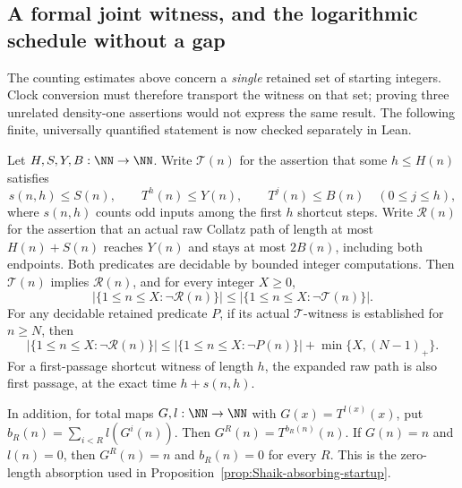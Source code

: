 \subsection{A formal joint witness, and the logarithmic schedule without a gap}

The counting estimates above concern a \emph{single} retained set of
starting integers. Clock conversion must therefore transport the
witness on that set; proving three unrelated density-one assertions
would not express the same result. The following finite, universally
quantified statement is now checked separately in Lean.

\begin{proposition}
\label{prop:Shaik-joint-certificate}
Let \(H,S,Y,B:\NN\to\NN\). Write \(\mathcal T(n)\) for the assertion
that some \(h\le H(n)\) satisfies
\[
 s(n,h)\le S(n),\qquad T^h(n)\le Y(n),\qquad
 T^j(n)\le B(n)\quad(0\le j\le h),
\]
where \(s(n,h)\) counts odd inputs among the first \(h\) shortcut
steps. Write \(\mathcal R(n)\) for the assertion that an actual
raw Collatz path of length at most \(H(n)+S(n)\) reaches \(Y(n)\)
and stays at most \(2B(n)\), including both endpoints.
Both predicates are decidable by bounded integer computations.
Then \(\mathcal T(n)\) implies \(\mathcal R(n)\), and for every
integer \(X\ge0\),
\begin{equation}\label{eq:Shaik-joint-count}
 |\{1\le n\le X:\neg\mathcal R(n)\}|
 \le|\{1\le n\le X:\neg\mathcal T(n)\}|.
\end{equation}
For any decidable retained predicate \(P\), if its actual
\(\mathcal T\)-witness is established for \(n\ge N\), then
\begin{equation}\label{eq:Shaik-joint-startup}
 |\{1\le n\le X:\neg\mathcal R(n)\}|
 \le|\{1\le n\le X:\neg P(n)\}|+\min\{X,(N-1)_+\}.
\end{equation}
For a first-passage shortcut witness of length \(h\), the expanded raw
path is also first passage, at the exact time \(h+s(n,h)\).

In addition, for total maps \(G,l:\NN\to\NN\) with
\(G(x)=T^{l(x)}(x)\), put
\(b_R(n)=\sum_{i<R}l(G^i(n))\). Then
\(G^R(n)=T^{b_R(n)}(n)\).
If \(G(n)=n\) and \(l(n)=0\), then \(G^R(n)=n\) and \(b_R(n)=0\)
for every \(R\). This is the zero-length absorption used in
Proposition~\ref{prop:Shaik-absorbing-startup}.
\end{proposition}

